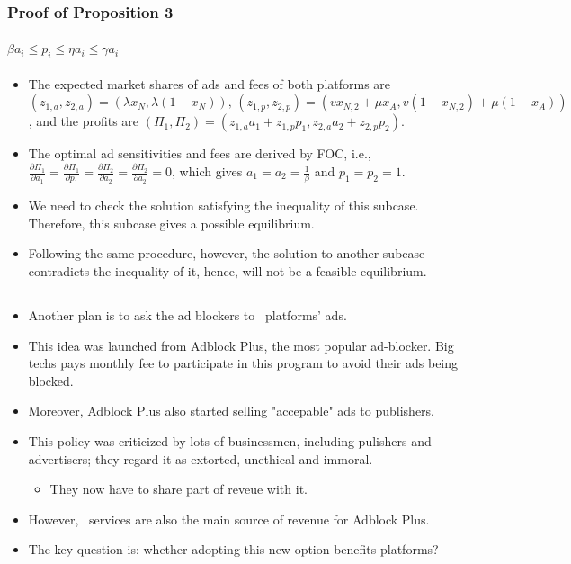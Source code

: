 \documentclass{beamer}
\newcommand{\hl}[1]{\textcolor{myblue}{#1}}
\newcommand{\wl}{\textch{\textcolor{myblue}{White-List}}}
\begin{document}
\begin{frame}%
    \frametitle{Proof of Proposition 3}
    \framesubtitle{$\beta a_i\leq p_i\leq\eta a_i\leq\gamma a_i$}
    \begin{itemize}
        \item The expected market shares of ads and fees of both platforms are
            $(z_{1,a},z_{2,a})=\left(\lambda x_N,\lambda(1-x_N)\right), \,
            (z_{1,p},z_{2,p})=\left(vx_{N,2}+\mu x_A, v(1-x_{N,2})+\mu(1-x_A)\right)$,
            and the profits are $(\Pi_1,\Pi_2)=(z_{1,a}a_1+z_{1,p}p_1,z_{2,a}a_2+z_{2,p}p_2)$.
        \item The optimal ad sensitivities and fees are derived by FOC, i.e.,
            $\frac{\partial\Pi_1}{\partial a_1}=\frac{\partial\Pi_1}{\partial p_1}=
            \frac{\partial\Pi_2}{\partial a_2}=\frac{\partial\Pi_2}{\partial a_2}=0$,
            which gives $a_1=a_2=\frac{1}{\beta}$ and $p_1=p_2=1$.
        \item We need to \hl{check the solution satisfying the inequality of this subcase}. Therefore,
            \hl{this subcase gives a possible equilibrium}.
        \item Following the same procedure, however, the solution to another subcase contradicts
            the inequality of it, hence, will not be a feasible equilibrium.
    \end{itemize}
\end{frame}

\subsection{\wl}
\begin{frame}%
    \frametitle{\wl}
    \framesubtitle{}
    \begin{itemize}
        \item Another plan is to ask the ad blockers to \wl\ platforms' ads.
        \item This idea was launched from Adblock Plus, the most popular ad-blocker.
            Big techs pays monthly fee to participate in this program to avoid their 
            ads being blocked.
        \item Moreover, Adblock Plus also started selling "accepable" ads to publishers.
        \item This policy was criticized by lots of businessmen, including
            pulishers and advertisers; they regard it as
            extorted, unethical and immoral.
            \begin{itemize}
                \item They now have to share part of reveue with it.
            \end{itemize}
        \item However, \wl\ services are also the main source of revenue for Adblock Plus.
        \item The key question is: \hl{whether adopting this new option benefits platforms?}
    \end{itemize}
\end{frame}
\end{document}
